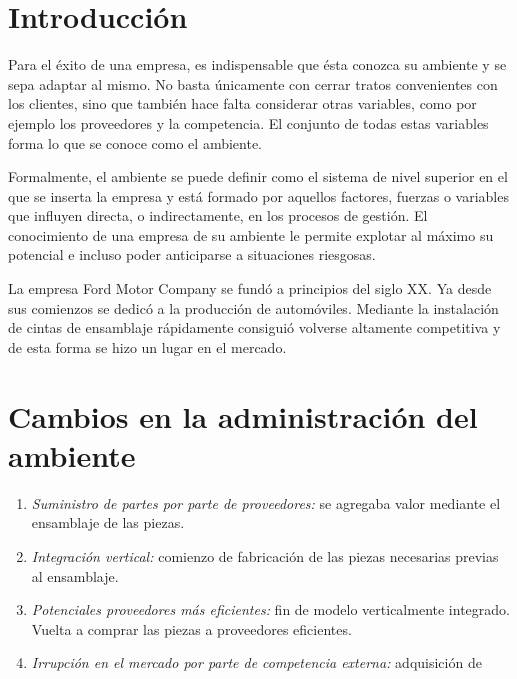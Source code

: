 \section{Introducci\'on}
	Para el \'exito de una empresa, es indispensable que \'esta conozca su ambiente y se sepa adaptar al mismo.
	No basta \'unicamente con cerrar tratos convenientes con los clientes, sino que tambi\'en hace falta considerar otras variables, como por ejemplo los proveedores y la competencia.
	El conjunto de todas estas variables forma lo que se conoce como el ambiente.

	Formalmente, el ambiente se puede definir como el sistema de nivel superior en el que se inserta la empresa y est\'a formado por aquellos factores, fuerzas o variables que influyen directa, o indirectamente, en los procesos de gesti\'on\cite{ITE}.
	El conocimiento de una empresa de su ambiente le permite explotar al m\'aximo su potencial e incluso poder anticiparse a situaciones riesgosas.

	La empresa Ford Motor Company  se fund\'o a principios del siglo XX.
	Ya desde sus comienzos se dedic\'o a la producci\'on de autom\'oviles.
	Mediante la instalaci\'on de cintas de ensamblaje r\'apidamente consigui\'o volverse altamente competitiva y de esta forma se hizo un lugar en el mercado.

\section{Cambios en la administraci\'on del ambiente}
	\begin{enumerate}
		\item{\emph{Suministro de partes por parte de proveedores:}} se agregaba valor mediante el ensamblaje de las piezas.
		\item{\emph{Integraci\'on vertical:}} comienzo de fabricaci\'on de las piezas necesarias previas al ensamblaje.
		\item{\emph{Potenciales proveedores m\'as eficientes:}} fin de modelo verticalmente integrado. Vuelta a comprar las piezas a proveedores eficientes.
		\item{\emph{Irrupci\'on en el mercado por parte de competencia externa:}} adquisici\'on de porcentajes en las empresas de proveedoras.
	\end{enumerate}

\section{An\'alisis}

